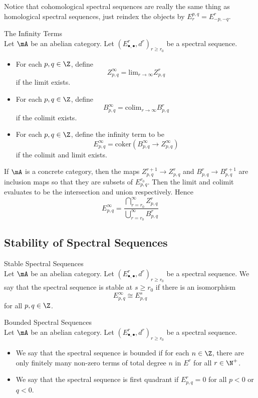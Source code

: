\documentclass[a4paper]{article}
\begin{document}
Notice that cohomological spectral sequences are really the same thing as homological spectral sequences, just reindex the objects by $E_r^{p,q}=E_{-p,-q}^r$. 

\begin{defn}{The Infinity Terms}{}\\
Let $\mA$ be an abelian category. Let $(E_{\bullet,\bullet}^r,d^r)_{r\geq r_0}$ be a spectral sequence. 
\begin{itemize}
\item For each $p,q\in\Z$, define $$Z_{p,q}^\infty=\text{lim}_{r\to\infty}Z_{p,q}^r$$ if the limit exists. 
\item For each $p,q\in\Z$, define $$B_{p,q}^\infty=\text{colim}_{r\to\infty}B_{p,q}^r$$ if the colimit exists. 
\item For each $p,q\in\Z$, define the infinity term to be $$E_{p,q}^\infty=\text{coker}(B_{p,q}^\infty\to Z_{p,q}^\infty)$$ if the colimit and limit exists. 
\end{itemize}
\end{defn}

If $\mA$ is a concrete category, then the maps $Z_{p,q}^{r+1}\to Z_{p,q}^r$ and $B_{p,q}^r\to B_{p,q}^{r+1}$ are inclusion maps so that they are subsets of $E_{p,q}^{r_0}$. Then the limit and colimit evaluates to be the intersection and union respectively. Hence $$E_{p,q}^\infty=\frac{\bigcap_{r=r_0}^\infty Z_{p,q}^r}{\bigcup_{r=r_0}^\infty B_{p,q}^r}$$

\subsection{Stability of Spectral Sequences}
\begin{defn}{Stable Spectral Sequences}{}\\
Let $\mA$ be an abelian category. Let $(E_{\bullet,\bullet}^r,d^r)_{r\geq r_0}$ be a spectral sequence. We say that the spectral sequence is stable at $s\geq r_0$ if there is an isomorphism $$E_{p,q}^\infty\cong E_{p,q}^s$$ for all $p,q\in\Z$. 
\end{defn}

\begin{defn}{Bounded Spectral Sequences}{}\\
Let $\mA$ be an abelian category. Let $(E_{\bullet,\bullet}^r,d^r)_{r\geq r_0}$ be a spectral sequence. 
\begin{itemize}
\item We say that the spectral sequence is bounded if for each $n\in\Z$, there are only finitely many non-zero terms of total degree $n$ in $E^r$ for all $r\in\N^+$. 
\item We say that the spectral sequence is first quadrant if $E_{p,q}^r=0$ for all $p<0$ or $q<0$. 
\end{itemize}
\end{defn}
\end{document}
